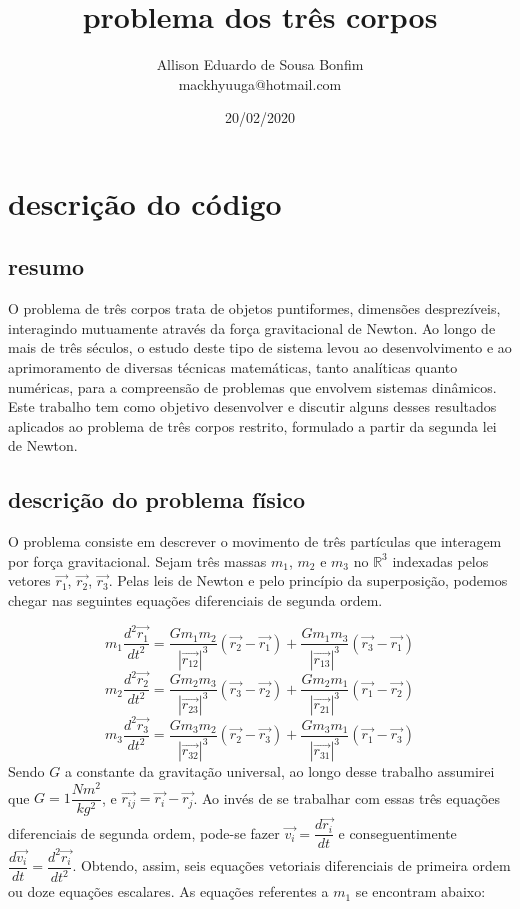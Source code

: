 \documentclass[a4paper.12pt]{article}
\title{problema dos três corpos}
\author{Allison Eduardo de Sousa Bonfim\\ mackhyuuga@hotmail.com}
\date{20/02/2020}
\begin{document}
\maketitle
\newpage

\tableofcontents

\section{descrição do código}

\subsection{resumo}

O problema de três corpos trata de objetos puntiformes, dimensões desprezíveis, interagindo mutuamente através da força gravitacional de Newton. Ao longo de mais de três séculos, o estudo deste tipo de sistema levou ao desenvolvimento e ao aprimoramento de diversas técnicas matemáticas, tanto analíticas quanto numéricas, para a compreensão de problemas que envolvem sistemas dinâmicos. Este trabalho tem como objetivo desenvolver e discutir alguns desses resultados aplicados ao problema de três corpos restrito, formulado a partir da segunda lei de Newton.


\subsection{descrição do problema físico}

	O problema consiste em descrever o movimento de três partículas que interagem por força gravitacional. Sejam três massas $m_1$, $m_2$ e $m_3$ no $\mathbb{R}^3$ indexadas pelos vetores $\vec{r_1}$, $\vec{r_2}$, $\vec{r_3}$. Pelas leis de Newton e pelo princípio da superposição, podemos chegar nas seguintes equações diferenciais de segunda ordem.
	
	\begin{equation}
	m_1\dfrac{d^2\vec{r_1}}{dt^2}=\dfrac{Gm_1m_2}{|\vec{r_{12}}|^3}(\vec{r_2}-\vec{r_1})+\dfrac{Gm_1m_3}{|\vec{r_{13}}|^3}(\vec{r_3}-\vec{r_1})
	\end{equation}
	\begin{equation}
	m_2\dfrac{d^2\vec{r_2}}{dt^2}=\dfrac{Gm_2m_3}{|\vec{r_{23}}|^3}(\vec{r_3}-\vec{r_2})+\dfrac{Gm_2m_1}{|\vec{r_{21}}|^3}(\vec{r_1}-\vec{r_2})
	\end{equation}
	\begin{equation}
	m_3\dfrac{d^2\vec{r_3}}{dt^2}=\dfrac{Gm_3m_2}{|\vec{r_{32}}|^3}(\vec{r_2}-\vec{r_3})+\dfrac{Gm_3m_1}{|\vec{r_{31}}|^3}(\vec{r_1}-\vec{r_3})
	\end{equation}
	Sendo $G$ a constante da gravitação universal, ao longo desse trabalho assumirei que $G=1\dfrac{Nm^2}{kg^2}$, e $\vec{r_{ij}} = \vec{r_i} - \vec{r_j}$. Ao invés de se trabalhar com essas três equações diferenciais de segunda ordem, pode-se fazer $\vec{v_i}=\dfrac{d\vec{r_i}}{dt}$ e conseguentimente $\dfrac{d\vec{v_i}}{dt}=\dfrac{d^2\vec{r_i}}{dt^2}$. Obtendo, assim, seis equações vetoriais diferenciais de
	primeira ordem ou doze equações escalares. As equações referentes a $m_1$ se encontram abaixo:  
    
\end{document}
